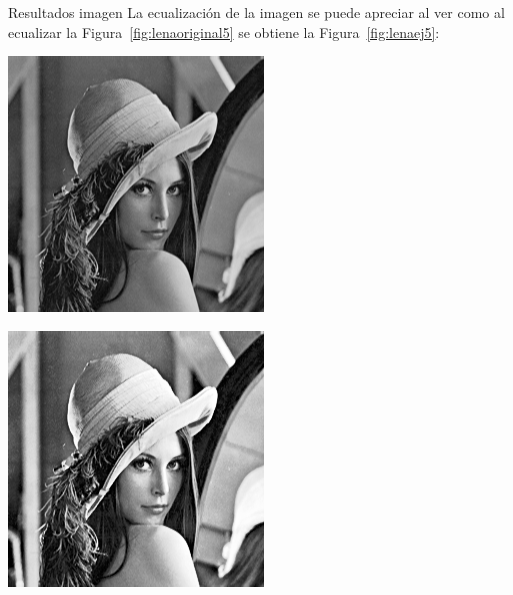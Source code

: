 \documentclass{beamer}
\begin{document}
\begin{frame}[fragile]{Resultados imagen}
	\justifying
	La ecualización de la imagen se puede apreciar al ver como al ecualizar la Figura~\ref{fig:lenaoriginal5} se obtiene la Figura~\ref{fig:lenaej5}:
	\vspace{0.5cm}
	
	\centering
	\begin{minipage}{0.45\linewidth}
		\centering
		\includegraphics[width=\linewidth]{../results/lena_original}
		\label{fig:lenaoriginal5}
	\end{minipage}\hfill
	\begin{minipage}{0.45\linewidth}
		\centering
		\includegraphics[width=\linewidth]{../results/lena_ej5}

\end{minipage}
\end{frame}
\end{document}
